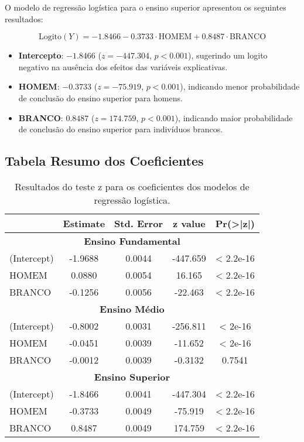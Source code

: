 \documentclass[a4paper,12pt]{article}
\begin{document}
O modelo de regressão logística para o ensino superior apresentou os seguintes resultados:

\begin{equation}
\text{Logito}(Y) = -1.8466 - 0.3733 \cdot \text{HOMEM} + 0.8487 \cdot \text{BRANCO}
\end{equation}

\begin{itemize}
    \item \textbf{Intercepto}: $-1.8466$ ($z = -447.304$, $p < 0.001$), sugerindo um logito negativo na ausência dos efeitos das variáveis explicativas.
    \item \textbf{HOMEM}: $-0.3733$ ($z = -75.919$, $p < 0.001$), indicando menor probabilidade de conclusão do ensino superior para homens.
    \item \textbf{BRANCO}: $0.8487$ ($z = 174.759$, $p < 0.001$), indicando maior probabilidade de conclusão do ensino superior para indivíduos brancos.
\end{itemize}


\subsection{Tabela Resumo dos Coeficientes}

\begin{table}[h]
    \centering
    \begin{tabular}{lcccc}
        \toprule
        & Estimate & Std. Error & z value & Pr(>|z|) \\
        \midrule
        \multicolumn{5}{c}{\textbf{Ensino Fundamental}} \\
        (Intercept) & -1.9688 & 0.0044 & -447.659 & < 2.2e-16 \\
        HOMEM       &  0.0880 & 0.0054 &  16.165  & < 2.2e-16 \\
        BRANCO      & -0.1256 & 0.0056 & -22.463  & < 2.2e-16 \\
        \midrule
        \multicolumn{5}{c}{\textbf{Ensino Médio}} \\
        (Intercept) & -0.8002 & 0.0031 & -256.811 & < 2e-16 \\
        HOMEM       & -0.0451 & 0.0039 & -11.652  & < 2e-16 \\
        BRANCO      & -0.0012 & 0.0039 &  -0.3132 & 0.7541 \\
        \midrule
        \multicolumn{5}{c}{\textbf{Ensino Superior}} \\
        (Intercept) & -1.8466 & 0.0041 & -447.304 & < 2.2e-16 \\
        HOMEM       & -0.3733 & 0.0049 & -75.919  & < 2.2e-16 \\
        BRANCO      &  0.8487 & 0.0049 & 174.759  & < 2.2e-16 \\
        \bottomrule
    \end{tabular}
    \caption{Resultados do teste z para os coeficientes dos modelos de regressão logística.}
    \label{tab:coeficientes}
\end{table}
\end{document}

